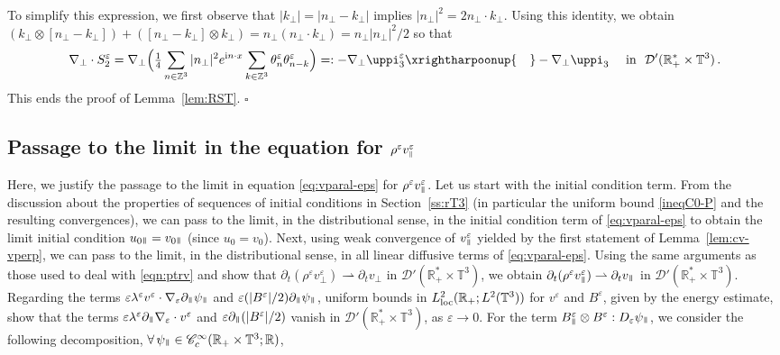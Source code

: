 \documentclass[11pt,reqno]{amsart}
\def\endnamedproof{{\hfill $\square$\\ \vspace{0.5em}}}
\def \R{{\mathbb{R}}}
\def \Z{{\mathbb{Z}}}
\def \T{{\mathbb{T}}}
\newcommand{\myparallel}{{\mkern3mu\vphantom{\perp}\vrule depth 0pt\mkern2mu\vrule depth 0pt\mkern3mu}}
\begin{document}
  To simplify this expression, we first observe that $|k_\perp|=|n_\perp -k_\perp|$ implies $|n_\perp|^2=2n_\perp\cdot k_\perp$. Using this identity, we  obtain  $(k_\perp \otimes [n_\perp-k_\perp])+( [n_\perp-k_\perp] \otimes k_\perp)= n_\perp(n_\perp\cdot k_\perp)=n_\perp|n_\perp|^2/2$ so that
  \[
  \nabla_\perp \cdot S_2^\varepsilon =\nabla_\perp \Big(\tfrac 14\sum_{n\in\Z^3}
  |n_\perp|^2 e^{{\rm i}n\cdot x}  \sum_{k\in\Z^3} \theta_n^\varepsilon \theta_{n-k}^\varepsilon
  \Big) =: -\nabla_\perp \uppi_3^\varepsilon \xrightharpoonup{\quad}  -\nabla_\perp \uppi_3 \ \ \  \mbox{ in} \ \ \mathcal D'(\R_+^* \times \T^3)\,.
  \]
  This ends the proof of Lemma~\ref{lem:RST}.
\endnamedproof


\subsection{Passage to the limit in the equation for $\rho^\varepsilon v_{\raisebox{0.5pt}{$\scriptscriptstyle\parallel$}}^\varepsilon $}
\label{ss:cv-rvpara-P}
Here,  we justify the passage to the limit in equation \eqref{eq:vparal-eps} for $\rho^\varepsilon v_\myparallel^\varepsilon$. Let us start with the initial condition term. From the discussion about the properties of sequences of initial conditions in Section~\ref{ss:rT3} (in particular the uniform bound \eqref{ineqC0-P} and the resulting convergences), we can pass to the limit, in the distributional sense, in the initial condition term of \eqref{eq:vparal-eps} to obtain the limit initial condition $u_{0 \myparallel}=v_{0 \myparallel}$ (since $u_0=v_0$). Next, using weak convergence of $v_\myparallel^\varepsilon$  yielded by the first statement of Lemma~\ref{lem:cv-vperp},  we can pass to the limit, in the distributional sense, in all linear diffusive terms of \eqref{eq:vparal-eps}. Using the same arguments as those used to deal with \eqref{eqn:ptrv} and show that $\partial_t(\rho^\varepsilon v_\perp^\varepsilon) \rightharpoonup \partial_t v_\perp$ in $\mathcal D'(\R_+^* \times \T^3)$, we obtain $\partial_t(\rho^\varepsilon v_\myparallel^\varepsilon) \rightharpoonup \partial_t v_\myparallel$ in $\mathcal D'(\R_+^*\times \T^3)$. Regarding the terms $\varepsilon \lambda^\varepsilon v^\varepsilon \cdot \nabla_\varepsilon \partial_\myparallel \psi_\myparallel $ and $\varepsilon (|B^\varepsilon|/2) \partial_\myparallel \psi_\myparallel$, uniform bounds in $L_{\rm loc}^2(\R_+;L^2(\T^3))$ for $v^\varepsilon $ and $B^\varepsilon$, given by the energy estimate, show that the terms $\varepsilon\lambda^\varepsilon\partial_\myparallel \nabla_\varepsilon\cdot v^\varepsilon $ and $\varepsilon \partial_\myparallel (|B^\varepsilon|/2)$ vanish  in  $\mathcal D'(\R_+^* \times \T^3)$, as $\varepsilon \rightarrow 0$. For the term $B_\myparallel^\varepsilon \otimes B^\varepsilon : D_\varepsilon\psi_\myparallel$, we consider the following decomposition, $\forall \,\psi_\myparallel \in \mathscr{C}_c^\infty(\R_+\times \T^3;\R)$, 
\end{document}

